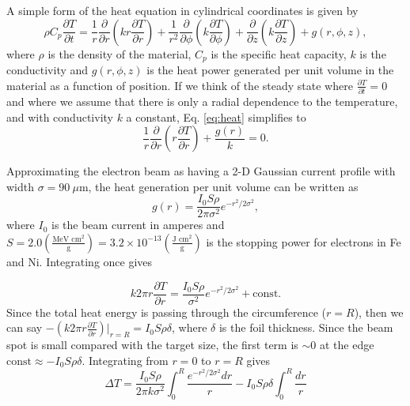 \documentclass[12pt]{article}
\begin{document}
A simple form of the heat equation in cylindrical coordinates is given by
\begin{equation}
\rho C_p\frac{\partial T}{\partial t}=\frac{1}{r}\frac{\partial}{\partial r}\left(kr\frac{\partial T}{\partial r}\right)+\frac{1}{r^2}\frac{\partial}{\partial \phi}\left(k\frac{\partial T}{\partial \phi}\right)+\frac{\partial}{\partial z}\left(k\frac{\partial T}{\partial z}\right)+g(r,\phi,z),
\label{eq:heat}
\end{equation} 
where $\rho$ is the density of the material, $C_p$ is the specific heat capacity, $k$ is the conductivity and $g(r,\phi,z)$ is the heat power generated per unit volume in the material as a function of position. If we think of the steady state where $\frac{\partial T}{\partial t}=0$ and where we assume that there is only a radial dependence to the temperature, and with conductivity $k$ a constant, Eq. \ref{eq:heat} simplifies to
\begin{equation}
\frac{1}{r}\frac{\partial}{\partial r}\left(r\frac{\partial T}{\partial r}\right)+\frac{g(r)}{k}=0.
\label{eq:heat_simp}
\end{equation} 

Approximating the electron beam as having a 2-D Gaussian current profile with width $\sigma=90~\mu$m, the heat generation per unit volume can be written as 
\begin{equation}
g(r)=\frac{I_0S\rho}{2\pi\sigma^2}e^{-r^2/2\sigma^2},
\label{eq:specific_heat_gen}
\end{equation}
 where $I_0$ is the beam current in amperes and $S=2.0\left(\frac{\textrm{MeV~cm}^2}{\textrm{g}}\right)=3.2\times10^{-13}\left(\frac{\textrm{J~cm}^2}{\textrm{g}}\right)$ is the stopping power for electrons in Fe and Ni. Integrating once gives
 
\begin{equation}
k2\pi r\frac{\partial T}{\partial r}=\frac{I_0S\rho}{\sigma^2} e^{-r^2/2\sigma^2}+\textrm{const}.
\end{equation}
Since the total heat energy is passing through the circumference ($r=R$), then we can say $-\left(k2\pi r\frac{\partial T}{\partial r}\right)\rvert_{r=R}=I_0S\rho\delta$, where $\delta$ is the foil thickness. Since the beam spot is small compared with the target size, the first term is $\sim0$ at the edge $\textrm{const}\approx-I_0S\rho\delta$. Integrating from $r=0$ to $r=R$ gives
\[
\Delta T = \frac{I_0S\rho}{2\pi k\sigma^2} \int_0^R\frac{e^{-r^2/2\sigma^2}dr}{r}-I_0S\rho\delta\int_0^R\frac{dr}{r}
\]
\FloatBarrier
\end{document}
